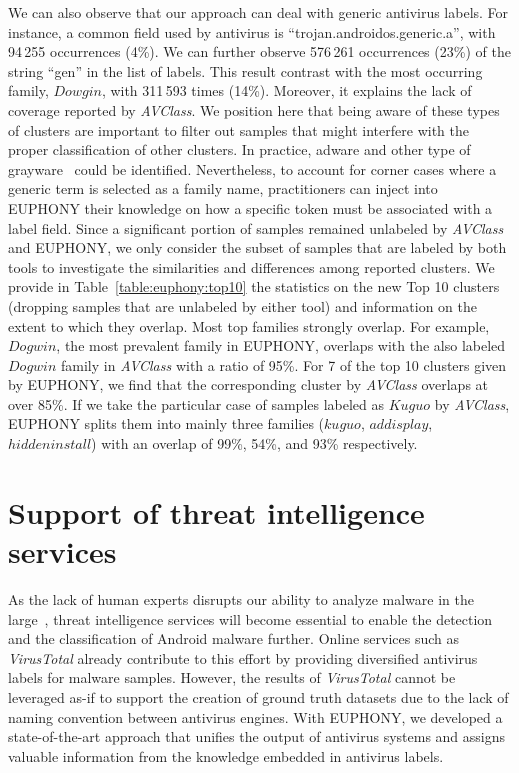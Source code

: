We can also observe that our approach can deal with generic antivirus labels.
For instance, a common field used by antivirus is ``trojan.androidos.generic.a'', with 94\,255 occurrences (4\%).
We can further observe 576\,261 occurrences (23\%) of the string ``gen'' in the list of labels.
This result contrast with the most occurring family, $Dowgin$, with 311\,593 times (14\%).
Moreover, it explains the lack of coverage reported by {\em AVClass}.
We position here that being aware of these types of clusters are important to filter out samples that might interfere with the proper classification of other clusters.
In practice, adware and other type of grayware~\cite{suarez-tangil_evolution_2014} could be identified.
Nevertheless, to account for corner cases where a generic term is selected as a family name, practitioners can inject into EUPHONY their knowledge on how a specific token must be associated with a label field.
Since a significant portion of samples remained unlabeled by {\em AVClass} and EUPHONY, we only consider the subset of samples that are labeled by both tools to investigate the similarities and differences among reported clusters.
We provide in Table~\ref{table:euphony:top10} the statistics on the new Top 10 clusters (dropping samples that are unlabeled by either tool) and information on the extent to which they overlap.
Most top families strongly overlap.
For example, $Dogwin$, the most prevalent family in EUPHONY, overlaps with the also labeled $Dogwin$ family in {\em AVClass} with a ratio of 95\%.
For 7 of the top 10 clusters given by EUPHONY, we find that the corresponding cluster by {\em AVClass} overlaps at over 85\%.
If we take the particular case of samples labeled as $Kuguo$ by {\em AVClass}, EUPHONY splits them into mainly three families ($kuguo$, $addisplay$, $hiddeninstall$) with an overlap of 99\%, 54\%, and 93\% respectively.



\section{Support of threat intelligence services}
As the lack of human experts disrupts our ability to analyze malware in the large~\cite{ics2_cybersecurity_2018}, threat intelligence services will become essential to enable the detection and the classification of Android malware further.
Online services such as {\em VirusTotal} already contribute to this effort by providing diversified antivirus labels for malware samples.
However, the results of {\em VirusTotal} cannot be leveraged as-if to support the creation of ground truth datasets due to the lack of naming convention between antivirus engines.
With EUPHONY, we developed a state-of-the-art approach that unifies the output of antivirus systems and assigns valuable information from the knowledge embedded in antivirus labels.

